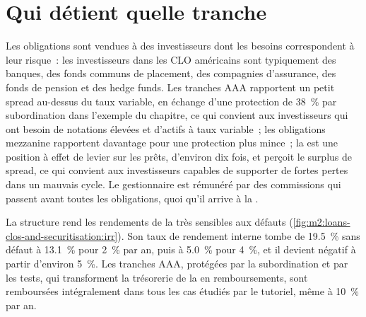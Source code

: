 \section{Qui détient quelle tranche}

Les obligations sont vendues à des investisseurs dont les besoins correspondent à leur risque~: les investisseurs dans les CLO américains
sont typiquement des banques, des fonds communs de placement, des compagnies d'assurance, des fonds de pension et des hedge funds.
Les tranches AAA rapportent un petit spread au-dessus du taux variable, en échange d'une protection
de 38~\% par subordination dans l'exemple du chapitre, ce qui convient aux investisseurs qui ont besoin de notations élevées
et d'actifs à taux variable~; les obligations mezzanine rapportent davantage pour une protection plus mince~; la
 est une position à effet de levier sur les prêts, d'environ dix fois, et perçoit le surplus
de spread, ce qui convient aux investisseurs capables de supporter de fortes pertes dans un mauvais cycle. Le gestionnaire
est rémunéré par des commissions qui passent avant toutes les obligations, quoi qu'il arrive à la .

La structure rend les rendements de la  très sensibles aux défauts
(\cref{fig:m2:loans-clos-and-securitisation:irr}). Son taux de rendement interne tombe
de 19.5~\% sans défaut à 13.1~\% pour 2~\% par an, puis à 5.0~\% pour 4~\%, et il devient
négatif à partir d'environ 5~\%. Les tranches AAA, protégées par la subordination et par les
tests, qui transforment la trésorerie de la  en remboursements, sont remboursées intégralement dans tous les cas
étudiés par le tutoriel, même à 10~\% par an.

